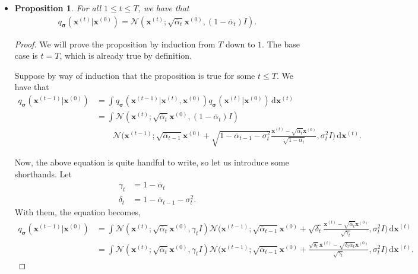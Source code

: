 \documentclass[10pt]{article}
\newtheorem{proposition}[lemma]{Proposition}
\newcommand{\dee}{\mathrm{d}}
\newcommand{\ve}[1]{\mathbf{#1}}
\newcommand{\ves}[1]{\boldsymbol{#1}}
\newcommand{\mcal}[1]{\mathcal{#1}}
\begin{document}
\begin{itemize}
\item \begin{proposition}
  For all $1 \leq t \leq T$, we have that
  \begin{align*}
    q_{\ves{\sigma}}(\ve{x}^{(t)}|\ve{x}^{(0)}) = \mcal{N}(\ve{x}^{(t)}; \sqrt{\overline{\alpha}_t} \ve{x}^{(0)}, (1-\overline{\alpha}_t) I).
  \end{align*}
\end{proposition}

\begin{proof}
  We will prove the proposition by induction from $T$ down to $1$. The base case is $t = T$, which is already true by definition.

  Suppose by way of induction that the proposition is true for some $t \leq T$. We have that
  \begin{align*}
    q_{\ves{\sigma}}(\ve{x}^{(t-1)}|\ve{x}^{(0)}) 
    &= \int q_{\ves{\sigma}}(\ve{x}^{(t-1)}|\ve{x}^{(t)}, \ve{x}^{(0)}) q_{\ves{\sigma}}(\ve{x}^{(t)}|\ve{x}^{(0)})\, \dee\ve{x}^{(t)} \\
    &= \int \mcal{N}(\ve{x}^{(t)}; \sqrt{\overline{\alpha}_t} \ve{x}^{(0)}, (1-\overline{\alpha}_t) I) \\
    & \qquad \mcal{N}\bigg( \ve{x}^{(t-1)} ; \sqrt{\overline{\alpha}_{t-1}} \ve{x}^{(0)} + \sqrt{1 - \overline{\alpha}_{t-1} - \sigma_t^2 } \frac{\ve{x}^{(t)} - \sqrt{\overline{\alpha}_t} \ve{x}^{(0)}}{\sqrt{1 - \overline{\alpha}_t}}, \sigma_t^2 I \bigg)\, \dee\ve{x}^{(t)}.
  \end{align*}

  Now, the above equation is quite handful to write, so let us introduce some shorthands. Let
  \begin{align*}
    \gamma_t &= 1 - \overline{\alpha}_t \\
    \delta_t &= 1 - \overline{\alpha}_{t-1} - \sigma_t^2.
  \end{align*}
  With them, the equation becomes,
  \begin{align*}
    q_{\ves{\sigma}}(\ve{x}^{(t-1)}|\ve{x}^{(0)}) 
    &= \int \mcal{N}(\ve{x}^{(t)}; \sqrt{\overline{\alpha}_t} \ve{x}^{(0)}, \gamma_t I)
    \mcal{N}\bigg(\ve{x}^{(t-1)};\sqrt{\overline{\alpha}_{t-1}} \ve{x}^{(0)} + \sqrt{\delta_t}\frac{\ve{x}^{(t)} - \sqrt{\overline{\alpha}_t}\ve{x}^{(0)}}{\sqrt{\gamma_t}}, \sigma^2_t I \bigg)\, \dee \ve{x}^{(t)} \\
    &= \int \mcal{N}(\ve{x}^{(t)}; \sqrt{\overline{\alpha}_t} \ve{x}^{(0)}, \gamma_t I)
    \mcal{N}\bigg(\ve{x}^{(t-1)};\sqrt{\overline{\alpha}_{t-1}} \ve{x}^{(0)} + \frac{\sqrt{\delta_t}\ve{x}^{(t)} - \sqrt{\delta_t \overline{\alpha}_t}\ve{x}^{(0)}}{\sqrt{\gamma_t}}, \sigma^2_t I \bigg)\, \dee \ve{x}^{(t)}.
  \end{align*}


\end{proof}
\end{itemize}
\end{document}
